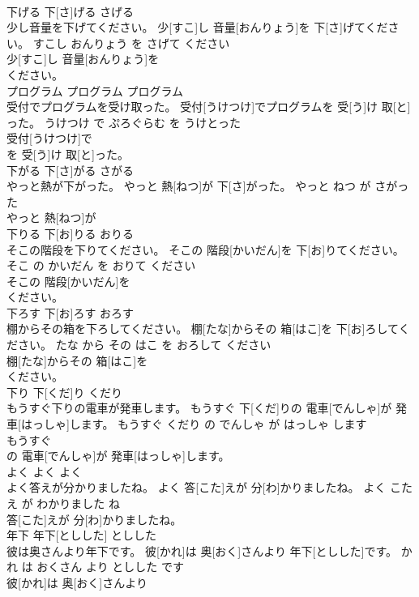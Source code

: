 \documentclass[8pt]{extreport}
\begin{document}
\begin{CJK}{UTF8}{min}
\\	下げる	下[さ]げる	さげる	
\\	少し音量を下げてください。	少[すこ]し 音量[おんりょう]を 下[さ]げてください。	すこし おんりょう を さげて ください	
\\	少[すこ]し 音量[おんりょう]を
\\	ください。		
\\	プログラム	プログラム	プログラム	
\\	受付でプログラムを受け取った。	受付[うけつけ]でプログラムを 受[う]け 取[と]った。	うけつけ で ぷろぐらむ を うけとった	
\\	受付[うけつけ]で
\\	を 受[う]け 取[と]った。		
\\	下がる	下[さ]がる	さがる	
\\	やっと熱が下がった。	やっと 熱[ねつ]が 下[さ]がった。	やっと ねつ が さがった	
\\	やっと 熱[ねつ]が
\\	下りる	下[お]りる	おりる	
\\	そこの階段を下りてください。	そこの 階段[かいだん]を 下[お]りてください。	そこ の かいだん を おりて ください	
\\	そこの 階段[かいだん]を
\\	ください。		
\\	下ろす	下[お]ろす	おろす	
\\	棚からその箱を下ろしてください。	棚[たな]からその 箱[はこ]を 下[お]ろしてください。	たな から その はこ を おろして ください	
\\	棚[たな]からその 箱[はこ]を
\\	ください。		
\\	下り	下[くだ]り	くだり	
\\	もうすぐ下りの電車が発車します。	もうすぐ 下[くだ]りの 電車[でんしゃ]が 発車[はっしゃ]します。	もうすぐ くだり の でんしゃ が はっしゃ します	
\\	もうすぐ
\\	の 電車[でんしゃ]が 発車[はっしゃ]します。		
\\	よく	よく	よく	
\\	よく答えが分かりましたね。	よく 答[こた]えが 分[わ]かりましたね。	よく こたえ が わかりました ね	
\\	答[こた]えが 分[わ]かりましたね。		
\\	年下	年下[としした]	としした	
\\	彼は奥さんより年下です。	彼[かれ]は 奥[おく]さんより 年下[としした]です。	かれ は おくさん より としした です	
\\	彼[かれ]は 奥[おく]さんより

\end{CJK}
\end{document}
